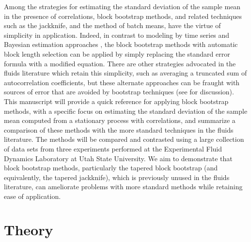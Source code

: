 \documentclass[onecolumn,12pt]{iopart}
\begin{document}
Among the strategies for estimating the standard deviation of the sample mean in the presence of correlations, block bootstrap methods, and related techniques such as the jackknife, and the method of batch means, have the virtue of simplicity in application.  Indeed, in contrast to modeling by time series and Bayesian estimation approaches \cite{barber2011,box2015}, the block bootstrap methods with automatic block length selection can be applied by simply replacing the standard error formula with a modified equation.  There are other strategies advocated in the fluids literature which retain this simplicity, such as averaging a truncated sum of autocorrelation coefficients, but these alternate approaches can be fraught with sources of error that are avoided by bootstrap techniques (see \cite{theunissen2008} for discussion).  This manuscript will provide a quick reference for applying block bootstrap methods, with a specific focus on estimating the standard deviation of the sample mean computed from a stationary process with correlations, and summarize a comparison of these methods with the more standard techniques in the fluids literature.  The methods will be compared and contrasted using a large collection of data sets from three experiments performed at the Experimental Fluid Dynamics Laboratory at Utah State University.  We aim to demonstrate that block bootstrap methods, particularly the tapered block bootstrap (and equivalently, the tapered jackknife), which is previously unused in the fluids literature, can ameliorate problems with more standard methods while retaining ease of application.


\section{Theory}
\end{document}
